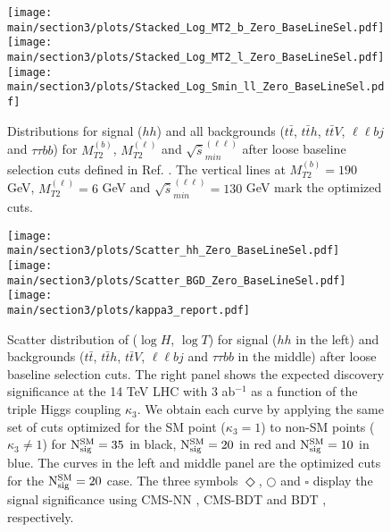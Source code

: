 %
\begin{figure*}[t]
\centering
\texttt{[image: \\main/section3/plots/Stacked\_Log\_MT2\_b\_Zero\_BaseLineSel.pdf]} \hspace*{-0.65cm}
\texttt{[image: \\main/section3/plots/Stacked\_Log\_MT2\_l\_Zero\_BaseLineSel.pdf]}   \hspace*{-0.65cm}
\texttt{[image: \\main/section3/plots/Stacked\_Log\_Smin\_ll\_Zero\_BaseLineSel.pdf]} 
\caption{\label{fig:newcuts} 
Distributions for signal ($hh$) and all backgrounds ($t \bar t$, $t\bar t h$, $t \bar t V$, $\ell\ell b j$ and $\tau\tau b b$) for $M_{T2}^{(b)}$, $M_{T2}^{(\ell)}$ and $\sqrt{\hat{s}}_{min}^{(\ell\ell)}$ after loose baseline selection cuts defined in Ref. \cite{Kim:2018cxf}. 
The vertical lines at $M_{T2}^{(b)} = 190$ GeV, $M_{T2}^{(\ell)}= 6$ GeV and $\sqrt{\hat{s}}_{min}^{(\ell\ell)}=130$ GeV mark the optimized cuts.}
\end{figure*}
%
%
%
\begin{figure}[t]
\centering
\texttt{[image: \\main/section3/plots/Scatter\_hh\_Zero\_BaseLineSel.pdf]}   \hspace*{-0.525cm}
\texttt{[image: \\main/section3/plots/Scatter\_BGD\_Zero\_BaseLineSel.pdf]} \hspace*{-0.1cm}
\texttt{[image: \\main/section3/plots/kappa3\_report.pdf]} 
\caption{\label{fig:scatter} 
Scatter distribution of ($\log H$, $\log T$) for signal ($hh$ in the left) and backgrounds ($t \bar t$, $t\bar t h$, $t \bar t V$, $\ell\ell b j$ and $\tau\tau b b$ in the middle) after loose baseline selection cuts.
The right panel shows the expected discovery significance at the 14 TeV LHC with 3 ab$^{-1}$ as a function of the triple Higgs coupling $\kappa_3$.
We obtain each curve by applying the same set of cuts optimized for the SM point ($\kappa_3=1$) to non-SM points ($\kappa_3 \neq 1$) for ${\rm N_{sig}^{SM}}=35$ in black, ${\rm N_{sig}^{SM}}=20$ in red and ${\rm N_{sig}^{SM}}=10$ in blue.
The curves in the left and middle panel are the optimized cuts for the ${\rm N_{sig}^{SM}}=20$ case.
The three symbols {\color{red}$\Diamond$}, {\color{black}$\bigcirc$} and {\color{blue}$\square$} display the signal significance 
using CMS-NN \cite{CMS:2015nat}, CMS-BDT \cite{CMS:2017cwx} and BDT \cite{Adhikary:2017jtu}, respectively.
}
\end{figure}
%

